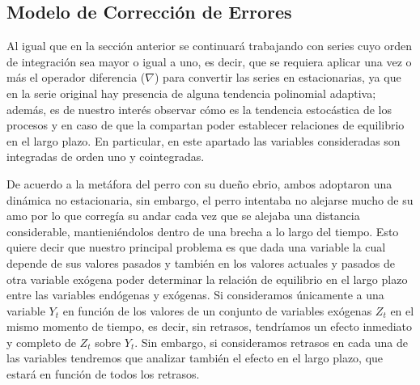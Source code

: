 \subsection{Modelo de Corrección de Errores}



Al igual que en la sección anterior se continuará trabajando con series cuyo orden de integración sea mayor o igual a uno, es decir, que se requiera aplicar una vez o más el operador diferencia ($\nabla$) para convertir las series en estacionarias, ya que en la serie original hay presencia de alguna tendencia polinomial adaptiva; además, es de nuestro interés  observar cómo es la tendencia estocástica de los procesos y en caso de que la compartan poder establecer relaciones de equilibrio en el largo plazo. En particular, en este apartado las variables consideradas son integradas de orden uno y cointegradas.  \bigskip


De acuerdo a la metáfora del perro con su due\~no ebrio, ambos adoptaron una dinámica no estacionaria, sin embargo, el perro intentaba no alejarse mucho de su amo por lo que corregía su andar cada vez que se alejaba una distancia considerable, mantieniéndolos dentro de una brecha a lo largo del tiempo.  Esto quiere decir que nuestro principal problema es que dada una variable la cual depende de sus valores pasados y también en los valores actuales y pasados de otra variable exógena poder determinar la relación de equilibrio en el largo plazo entre las variables endógenas y exógenas.  Si  consideramos únicamente a una variable $Y_t$ en función de los valores de un conjunto de variables exógenas $Z_t$ en el mismo momento de tiempo, es decir, sin retrasos, tendríamos un efecto inmediato y completo de $Z_t$ sobre $Y_t$. Sin embargo, si consideramos retrasos en cada una de las variables tendremos que analizar también el efecto en el largo plazo, que estará en función de todos los retrasos.\bigskip


